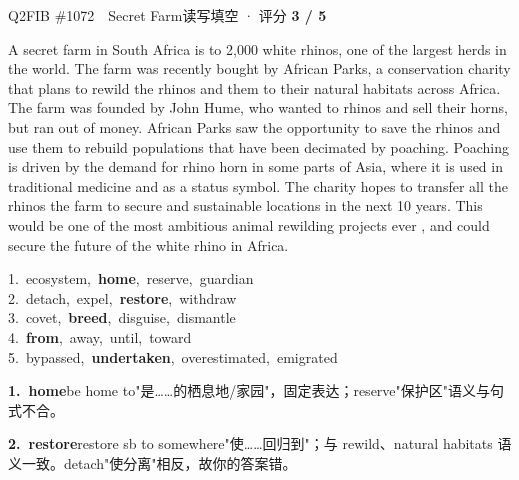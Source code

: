\begin{qblock}{Q2\quad FIB \#1072\ \ Secret Farm}{读写填空 · 评分 \textcolor{cAccent}{\bfseries 3 / 5}}
\begin{promptbox}
A secret farm in South Africa is  to 2,000 white rhinos, one of the largest herds in the world. The farm was recently bought by African Parks, a conservation charity that plans to rewild the rhinos and  them to their natural habitats across Africa. The farm was founded by John Hume, who wanted to  rhinos and sell their horns, but ran out of money. African Parks saw the opportunity to save the rhinos and use them to rebuild populations that have been decimated by poaching. Poaching is driven by the demand for rhino horn in some parts of Asia, where it is used in traditional medicine and as a status symbol. The charity hopes to transfer all the rhinos  the farm to secure and sustainable locations in the next 10 years. This would be one of the most ambitious animal rewilding projects ever , and could secure the future of the white rhino in Africa.
\end{promptbox}
{\small
1.\ ecosystem,\ \textbf{home},\ reserve,\ guardian\\
2.\ detach,\ expel,\ \textbf{restore},\ withdraw\\
3.\ covet,\ \textbf{breed},\ disguise,\ dismantle\\
4.\ \textbf{from},\ away,\ until,\ toward\\
5.\ bypassed,\ \textbf{undertaken},\ overestimated,\ emigrated}
\begin{notebox}\footnotesize
\textbf{1.\ home}\quad be home to"是……的栖息地/家园"，固定表达；reserve"保护区"语义与句式不合。\par\smallskip
\textbf{2.\ restore}\quad restore sb to somewhere"使……回归到"；与 rewild、natural habitats 语义一致。detach"使分离"相反，故你的答案错。\par\smallskip

\end{notebox}
\end{qblock}
